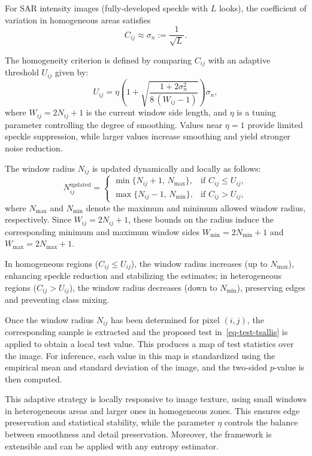 \documentclass[
  lettersize  journal,
]{IEEEtran}%
\begin{document}
For SAR intensity images (fully-developed speckle with \(L\) looks), the
coefficient of variation in homogeneous areas satisfies
\begin{equation*}
C_{ij} \approx \sigma_n := \frac{1}{\sqrt{L}}.
\end{equation*}

The homogeneity criterion is defined by comparing \(C_{ij}\) with an
adaptive threshold \(U_{ij}\) given by: \begin{equation}
U_{ij} = \eta\!\left( 1 + \sqrt{\frac{1 + 2\sigma_n^2}{8\,(W_{ij} - 1)}} \right)\sigma_n,
\end{equation} where \(W_{ij} = 2N_{ij} + 1\) is the current window side
length, and \(\eta\) is a tuning parameter controlling the degree of
smoothing. Values near \(\eta=1\) provide limited speckle suppression,
while larger values increase smoothing and yield stronger noise
reduction.

The window radius \(N_{ij}\) is updated dynamically and locally as
follows: \[
N_{ij}^{\text{updated}} =
\begin{cases}
\min\{N_{ij} + 1,\, N_{\max}\}, & \text{if } C_{ij} \leq U_{ij}, \\
\max\{N_{ij} - 1,\, N_{\min}\}, & \text{if } C_{ij} > U_{ij},
\end{cases}
\] where \(N_{\max}\) and \(N_{\min}\) denote the maximum and minimum
allowed window radius, respectively. Since \(W_{ij}=2N_{ij}+1\), these
bounds on the radius induce the corresponding minimum and maximum window
sides \(W_{\min}=2N_{\min}+1\) and \(W_{\max}=2N_{\max}+1\).

In homogeneous regions (\(C_{ij} \le U_{ij}\)), the window radius
increases (up to \(N_{\max}\)), enhancing speckle reduction and
stabilizing the estimates; in heterogeneous regions
(\(C_{ij} > U_{ij}\)), the window radius decreases (down to
\(N_{\min}\)), preserving edges and preventing class mixing.

Once the window radius \(N_{ij}\) has been determined for pixel
\((i,j)\), the corresponding sample is extracted and the proposed test
in~\eqref{eq-test-tsallis} is applied to obtain a local test value. This
produces a map of test statistics over the image. For inference, each
value in this map is standardized using the empirical mean and standard
deviation of the image, and the two-sided \(p\)-value is then computed.

This adaptive strategy is locally responsive to image texture, using
small windows in heterogeneous areas and larger ones in homogeneous
zones. This ensures edge preservation and statistical stability, while
the parameter \(\eta\) controls the balance between smoothness and
detail preservation. Moreover, the framework is extensible and can be
applied with any entropy estimator.
\end{document}
